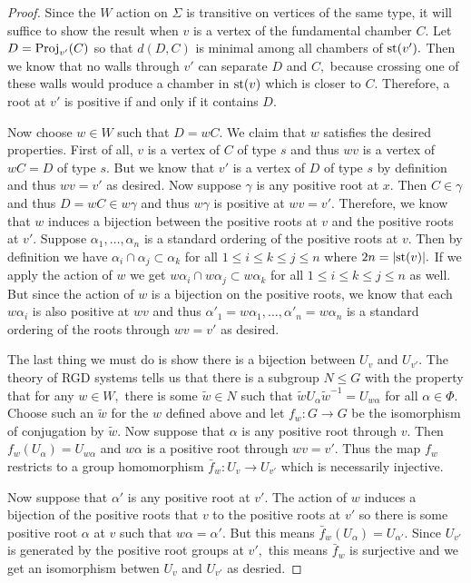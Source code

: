 \documentclass[class=book, crop=false,12 pt]{standalone}
\begin{document}
\begin{proof}
	Since the $W$ action on $\Sigma$ is transitive on vertices of the same type, it will suffice to show the result when $v$ is a vertex of the fundamental chamber $C.$ Let $D=\mathrm{Proj}_{v'}(C)$ so that $d(D,C)$ is minimal among all chambers of $\mathrm{st}(v').$ Then we know that no walls through $v'$ can separate $D$ and $C,$ because crossing one of these walls would produce a chamber in $\mathrm{st}(v)$ which is closer to $C.$ Therefore, a root at $v'$ is positive if and only if it contains $D.$

Now choose $w\in W$ such that $D=wC.$ We claim that $w$ satisfies the desired properties. First of all, $v$ is a vertex of $C$ of type $s$ and thus $wv$ is a vertex of $wC=D$ of type $s.$ But we know that $v'$ is a vertex of $D$ of type $s$ by definition and thus $wv=v'$ as desired. Now suppose $\gamma$ is any positive root at $x.$ Then $C\in \gamma$ and thus $D=wC\in w\gamma$ and thus $w\gamma$ is positive at $wv=v'.$ Therefore, we know that $w$ induces a bijection between the positive roots at $v$ and the positive roots at $v'.$ Suppose $\alpha_1,\dots,\alpha_n$ is a standard ordering of the positive roots at $v.$ Then by definition we have $\alpha_i\cap\alpha_j\subset\alpha_k$ for all $1\le i\le k\le j\le n$ where $2n=|\mathrm{st}(v)|.$ If we apply the action of $w$ we get $w\alpha_i\cap w\alpha_j\subset w\alpha_k$ for all $1\le i\le k\le j\le n$ as well. But since the action of $w$ is a bijection on the positive roots, we know that each $w\alpha_i$ is also positive at $wv$ and thus $\alpha'_1=w\alpha_1,\dots,\alpha'_n=w\alpha_n$ is a standard ordering of the roots through $wv=v'$ as desired.

The last thing we must do is show there is a bijection between $U_v$ and $U_{v'}.$ The theory of RGD systems tells us that there is a subgroup $N\le G$ with the property that for any $w\in W,$ there is some $\tilde{w}\in N$ such that $\tilde{w}U_\alpha \tilde{w}^{-1}=U_{w\alpha}$ for all $\alpha\in \Phi.$ Choose such an $\tilde{w}$ for the $w$ defined above and let $f_w:G\to G$ be the isomorphism of conjugation by $\tilde{w}.$ Now suppose that $\alpha$ is any positive root through $v.$ Then $f_w(U_\alpha)=U_{w\alpha}$ and $w\alpha$ is a positive root through $wv=v'.$ Thus the map $f_w$ restricts to a group homomorphism $\bar{f}_w:U_v\to U_{v'}$ which is necessarily injective. 

Now suppose that $\alpha'$ is any positive root at $v'.$ The action of $w$ induces a bijection of the positive roots that $v$ to the positive roots at $v'$ so there is some positive root $\alpha$ at $v$ such that $w\alpha=\alpha'.$ But this means $\bar{f}_w(U_\alpha)=U_{\alpha'}.$ Since $U_{v'}$ is generated by the positive root groups at $v',$ this means $\bar{f}_w$ is surjective and we get an isomorphism betwen $U_v$ and $U_{v'}$ as desried.
\end{proof}
\end{document}
